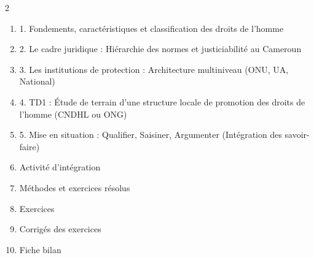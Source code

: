 \documentclass[11pt]{article}
\begin{document}
\begin{sommaire}
\begin{multicols}{2}
\begin{enumerate}
\item 1. Fondements, caractéristiques et classification des droits de l'homme
\item 2. Le cadre juridique : Hiérarchie des normes et justiciabilité au Cameroun
\item 3. Les institutions de protection : Architecture multiniveau (ONU, UA, National)
\item 4. TD1 : Étude de terrain d'une structure locale de promotion des droits de l'homme (CNDHL ou ONG)
\item 5. Mise en situation : Qualifier, Saisiner, Argumenter (Intégration des savoir-faire)
\item Activité d'intégration
\item Méthodes et exercices résolus
\item Exercices
\item Corrigés des exercices
\item Fiche bilan
\end{enumerate}
\end{multicols}
\end{sommaire}
\end{document}

